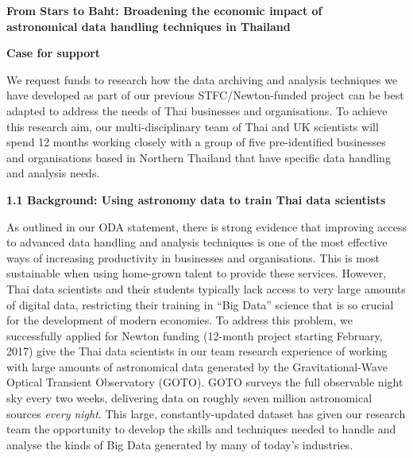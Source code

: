 \documentclass[11pt]{article}
\begin{document}
  \setcounter{figure}{0}
  \noindent
  {\LARGE \bf From Stars to Baht: Broadening the economic impact of \\
  astronomical data handling techniques in Thailand}
  
  \vspace{3mm}
  \noindent
  {\LARGE \bf Case for support}
  \vspace{3mm}
  
  \noindent
  We request funds to research how the data archiving and analysis techniques we have developed as part of our previous STFC/Newton-funded project can be best adapted to address the needs of Thai businesses and organisations. To achieve this research aim, our multi-disciplinary team of Thai and UK scientists will spend 12 months working closely with a group of five pre-identified businesses and organisations based in Northern Thailand that have specific data handling and analysis needs.
  
  \vspace{3mm}
  \noindent
  {\large \bf 1.1 Background: Using astronomy data to train Thai data scientists}
  
  \noindent
  As outlined in our ODA statement, there is strong evidence that improving access to advanced data handling and analysis techniques is one of the most effective ways of increasing productivity in businesses and organisations. This is most sustainable when using home-grown talent to provide these services. However, Thai data scientists and their students typically lack access to very large amounts of digital data, restricting their training in ``Big Data'' science that is so crucial for the development of modern economies. To address this problem, we successfully applied for Newton funding (12-month project starting February, 2017) give the Thai data scientists in our team research experience of working with large amounts of astronomical data generated by the Gravitational-Wave Optical Transient Observatory (GOTO). GOTO surveys the full observable night sky every two weeks, delivering data on roughly seven million astronomical sources {\it every night}. This large, constantly-updated dataset has given our research team the opportunity to develop the skills and techniques needed to handle and analyse the kinds of Big Data generated by many of today's industries.
  
\end{document}
